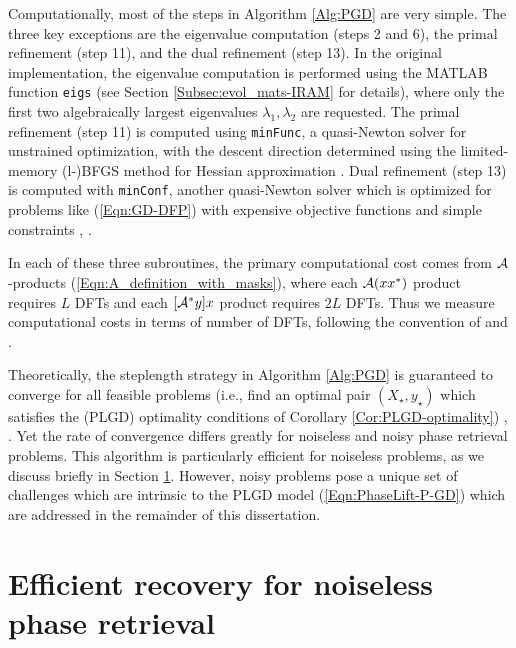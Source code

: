 Computationally, most of the steps in Algorithm \ref{Alg:PGD} are very simple.  The three key exceptions are the eigenvalue computation (steps 2 and 6), the primal refinement (step 11), and the dual refinement (step 13).  In the original implementation, the eigenvalue computation is performed using the MATLAB function \texttt{eigs} (see Section \ref{Subsec:evol_mats-IRAM} for details), where only the first two algebraically largest eigenvalues $\lambda_1, \lambda_2$ are requested.  The primal refinement (step 11) is computed using \texttt{minFunc}, a quasi-Newton solver for unstrained optimization, with the descent direction determined using the limited-memory (l-)BFGS method for Hessian approximation \cite{schmidt2005minFunc}.  Dual refinement (step 13) is computed with \texttt{minConf}, another quasi-Newton solver which is optimized for problems like (\ref{Eqn:GD-DFP}) with expensive objective functions and simple constraints \cite{schmidt2008minConf}, \cite{schmidt2009optimizing}.

In each of these three subroutines, the primary computational cost comes from ${\mathcal A}$-products (\ref{Eqn:A_definition_with_masks}), where each ${\mathcal A}(xx^*)$ product requires $L$ DFTs and each $[{\mathcal A}^*y]x$ product requires $2L$ DFTs.  Thus we measure computational costs in terms of number of DFTs, following the convention of \cite{DBLP:journals/tit/CandesLS15} and \cite{DBLP:journals/siamsc/FriedlanderM16}.





Theoretically, the steplength strategy in Algorithm \ref{Alg:PGD} is guaranteed to converge for all feasible problems (i.e., find an optimal pair $(X_\star, y_\star)$ which satisfies the (PLGD) optimality conditions of Corollary \ref{Cor:PLGD-optimality}) \cite{zhang2004nonmonotone}, \cite[Proposition 1.2.3 and Section 3.3.1]{bertsekas2016nonlinear}.  Yet the rate of convergence differs greatly for noiseless and noisy phase retrieval problems.  This algorithm is particularly efficient for noiseless problems, as we discuss briefly in Section \ref{Subsec:PLGD_algo-noiseless_success}.  However, noisy problems pose a unique set of challenges which are intrinsic to the PLGD model (\ref{Eqn:PhaseLift-P-GD}) which are addressed in the remainder of this dissertation.










\section{Efficient recovery for noiseless phase retrieval} 		\label{Subsec:PLGD_algo-noiseless_success}




